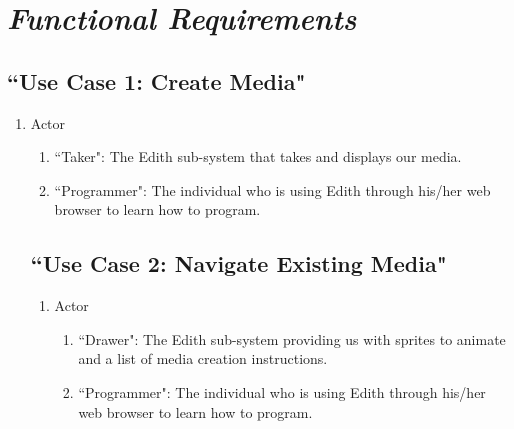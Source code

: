 \documentclass[12pt]{article}
\begin{document}
\section{\emph{Functional Requirements}}
	\subsection{``Use Case 1: Create Media"}
\begin{enumerate}
  \item Actor
  \begin{enumerate}
  		 \item ``Taker": The Edith sub-system that takes and displays our media.
       \item ``Programmer": The individual who is using Edith through his/her web browser to learn how to program.
  \end{enumerate}
  


  \subsection{``Use Case 2: Navigate Existing Media"}
\begin{enumerate}
  \item Actor
  \begin{enumerate}
      \item ``Drawer": The Edith sub-system providing us with sprites to animate and a list of media creation instructions.
      \item ``Programmer": The individual who is using Edith through his/her web browser to learn how to program.
  \end{enumerate}
  \end{enumerate}

  \end{enumerate}

	
\end{document}
